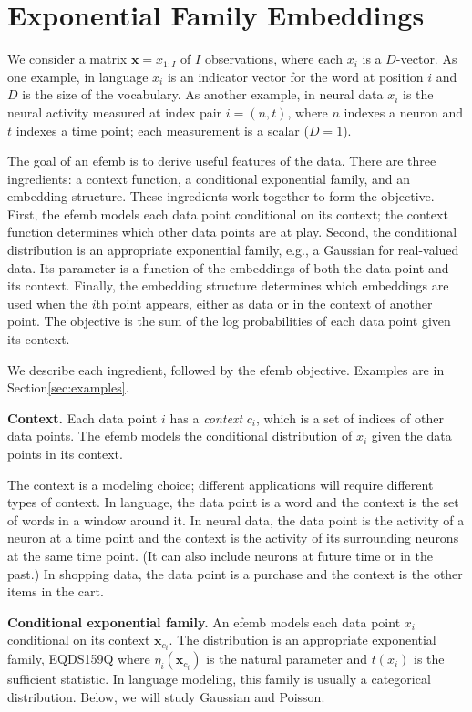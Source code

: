 \documentclass[12pt]{article}
\DeclareRobustCommand{\parhead}[1]{\vspace{0.05in} \textbf{#1} }
\DeclareRobustCommand{\mb}[1]{\ensuremath{\boldsymbol{\mathbf{#1}}}}
\begin{document}
\section{Exponential Family Embeddings}
\glsresetall

We consider a matrix ${\mb{x}} = x_{1:I}$ of $I$ observations, where each $x_i$ is a
$D$-vector. As one example, in language $x_i$ is an indicator vector
for the word at position $i$ and $D$ is the size of the vocabulary. As
another example, in neural data $x_i$ is the neural activity measured at index
pair $i = (n,t)$, where $n$ indexes a neuron and $t$ indexes a time
point; each measurement is a scalar ($D=1$).

The goal of an \gls{efemb} is to derive useful features of the data.
There are three ingredients: a context function, a conditional
exponential family, and an embedding structure. These ingredients work
together to form the objective. First, the \gls{efemb} models each
data point conditional on its context; the context function determines
which other data points are at play. Second, the conditional
distribution is an appropriate exponential family, e.g., a Gaussian
for real-valued data. Its parameter is a function of the embeddings of
both the data point and its context. Finally, the embedding structure
determines which embeddings are used when the $i$th point appears,
either as data or in the context of another point.  The objective is
the sum of the log probabilities of each data point given its context.

We describe each ingredient, followed by the \gls{efemb} objective. Examples are in Section\nobreakspace \ref {sec:examples}.

\parhead{Context.} Each data point $i$ has a {\em context} $c_i$,
which is a set of indices of other data points. The \gls{efemb} models
the conditional distribution of $x_i$ given the data points in its
context.

The context is a modeling choice; different applications will require
different types of context. In language, the data point is a word and
the context is the set of words in a window around it. In neural data,
the data point is the activity of a neuron at a time point and the
context is the activity of its surrounding neurons at the same time
point. (It can also include neurons at future time or in the past.) In
shopping data, the data point is a purchase and the context is the
other items in the cart.

\parhead{Conditional exponential family.} An \gls{efemb} models each
data point $x_i$ conditional on its context ${\mb{x}}_{c_i}$. The
distribution is an appropriate exponential family,
EQDS159Q
where $\eta_i({\mb{x}}_{c_i})$ is the natural parameter and $t(x_i)$ is
the sufficient statistic. In language modeling, this family is usually
a categorical distribution. Below, we will study Gaussian and Poisson.
\end{document}
